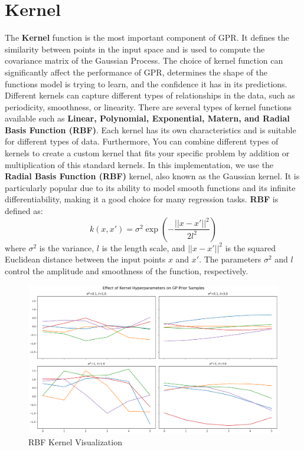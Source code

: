 \documentclass{article}
\begin{document}
\section{Kernel}
\label{label:kernel}
The \textbf{Kernel} function is the most important component of GPR. It defines the similarity between points in the input space and is used to compute the covariance matrix of the Gaussian Process. The choice of kernel function can significantly affect the performance of GPR, determines the shape of the functions model is trying to learn, and the confidence it has in its predictions. Different kernels can capture different types of relationships in the data, such as periodicity, smoothness, or linearity.
\newline
There are several types of kernel functions available such as \textbf{Linear, Polynomial, Exponential, Matern, and Radial Basis Function (RBF)}. Each kernel has its own characteristics and is suitable for different types of data. Furthermore, You can combine different types of kernels to create a custom kernel that fits your specific problem by addition or multiplication of this standard kernels.
\newline 
In this implementation, we use the \textbf{Radial Basis Function (RBF)} kernel, also known as the Gaussian kernel. It is particularly popular due to its ability to model smooth functions and its infinite differentiability, making it a good choice for many regression tasks. \textbf{RBF} is defined as:
\begin{equation}
    k(x, x') = \sigma^2 \exp\left(-\frac{||x - x'||^2}{2l^2}\right)
\end{equation}
where \( \sigma^2 \) is the variance, \( l \) is the length scale, and \( ||x - x'||^2 \) is the squared Euclidean distance between the input points \( x \) and \( x' \). The parameters \( \sigma^2 \) and \( l \) control the amplitude and smoothness of the function, respectively.

\begin{figure}[H]
    \centering
    \includegraphics[width=1\textwidth]{images/kernel_hp.png}
    \caption{RBF Kernel Visualization}
    \label{fig:rbf_kernel}
\end{figure}
\end{document}
